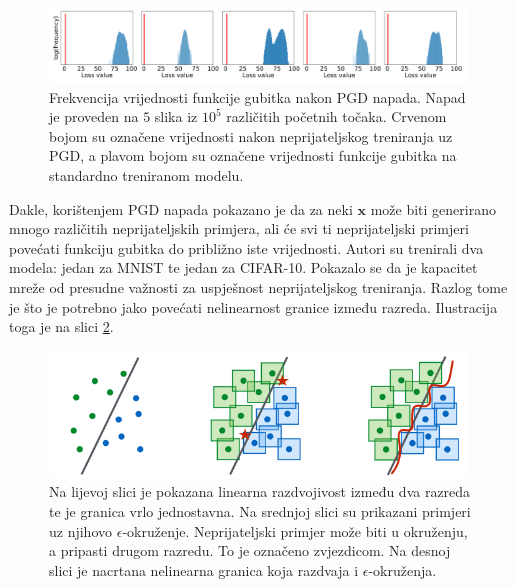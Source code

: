 \documentclass[utf8, diplomski]{fer}
\begin{document}
\begin{figure}[H]
\centering
\includegraphics[width=0.99\textwidth,keepaspectratio]{img/other/pgd_histogram.png}
\caption{Frekvencija vrijednosti funkcije gubitka nakon PGD napada. Napad je proveden na $5$ slika iz $10^{5}$ različitih početnih točaka. Crvenom bojom su označene vrijednosti nakon neprijateljskog treniranja uz PGD, a plavom bojom su označene vrijednosti funkcije gubitka na standardno treniranom modelu.}
\label{fig:pgd_histogram}
\end{figure}

Dakle, korištenjem PGD napada pokazano je da za neki $\boldsymbol{x}$ može biti generirano mnogo različitih neprijateljskih primjera, ali će svi ti neprijateljski primjeri povećati funkciju gubitka do približno iste vrijednosti. Autori su trenirali dva modela: jedan za MNIST te jedan za CIFAR-10. Pokazalo se da je kapacitet mreže od presudne važnosti za uspješnost neprijateljskog treniranja. Razlog tome je što je potrebno jako povećati nelinearnost granice između razreda. Ilustracija toga je na slici \ref{fig:pgd_nonlinearity}. 

\begin{figure}[H]
\centering
\includegraphics[width=0.99\textwidth,keepaspectratio]{img/other/pgd_nonlinearity.png}
\caption{Na lijevoj slici je pokazana linearna razdvojivost između dva razreda te je granica vrlo jednostavna. Na srednjoj slici su prikazani primjeri uz njihovo $\epsilon$-okruženje. Neprijateljski primjer može biti u okruženju, a pripasti drugom razredu. To je označeno zvjezdicom. Na desnoj slici je nacrtana nelinearna granica koja razdvaja i $\epsilon$-okruženja.}
\label{fig:pgd_nonlinearity}
\end{figure}
\end{document}
